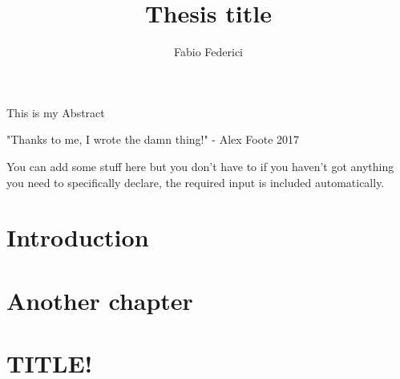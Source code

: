 \documentclass[]{yorkThesis}  %
\title{Thesis title}
\author{Fabio Federici}
\begin{document}
\titlePage
\abstract
{}
This is my Abstract

\contents

\acknowledgments
{}
"Thanks to me, I wrote the damn thing!" - Alex Foote 2017

\declaration
You can add some stuff here but you don't have to if you haven't got anything you need to specifically declare, the required input is included automatically.

\pagestyle{headings}
\chapter{Introduction}\label{chapter1}


\chapter{Another chapter}\label{chapter2}


\appendix
\chapter{TITLE!}
\label{Appendix1}

%

{}  %


\end{document}
